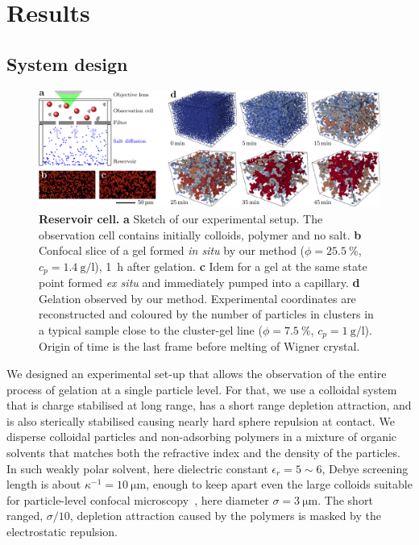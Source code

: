 \section*{Results}

\subsection*{System design}

\begin{figure}
	\includegraphics{figs/cell_vs_cap2.pdf}
	\caption{\textbf{Reservoir cell.} \textbf{a} Sketch of our experimental setup. The observation cell contains initially colloids, polymer and no salt. \textbf{b} Confocal slice of a gel formed \textit{in situ} by our method ($\phi=25.5~\%$, $c_p=\SI{1.4}{\gram\per\litre}$), \SI{1}{\hour} after gelation. \textbf{c} Idem for a gel at the same state point formed \textit{ex situ} and immediately pumped into a capillary. \textbf{d} Gelation observed by our method. Experimental coordinates are reconstructed and coloured by the number of particles in clusters in a typical sample close to the cluster-gel line ($\phi=7.5~\%$, $c_p=\SI{1}{\gram\per\litre}$). Origin of time is the last frame before melting of Wigner crystal.
	}
	\label{fig:cell_vs_cap}
\end{figure}

We designed an experimental set-up that allows the observation of the entire process of gelation at a single particle level. For that, we use a colloidal system that is charge stabilised at long range, has a short range depletion attraction, and is also sterically stabilised causing nearly hard sphere repulsion at contact. We disperse colloidal particles and non-adsorbing polymers in a  mixture of organic solvents that matches both the refractive index and the density of the particles. In such weakly polar solvent, here dielectric constant $\epsilon_r = 5\sim6$, Debye screening length is about $\kappa^{-1}=\SI{10}{\micro\metre}$, enough to keep apart even the large colloids suitable for particle-level confocal microscopy~\cite{Royall2003}, here diameter $\sigma=\SI{3}{\micro\metre}$. The short ranged, $\sigma/10$, depletion attraction caused by the polymers is masked by the electrostatic repulsion.

